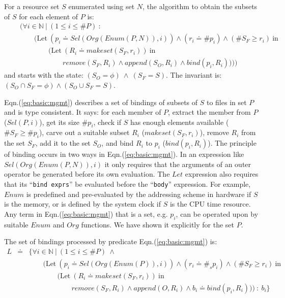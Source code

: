 \documentclass[draft]{article}
\def\names{\doteq}
\def\eqn#1{Eqn.(\ref{#1})}
\begin{document}
For  a resource set  $S$ enumerated  using set  $N$, the  algorithm to
obtain the subsets of $S$ for each element of $P$ is:
\begin{eqnarray}
  \label{eq:basic:mgmt}
  &~&
  \biggl(
  \forall i \in \mathbb{N}\ \vert\ (1 \le i \le \#P)\ :\ 
  \nonumber \\
  &~& \quad \quad 
  \bigl(\mathrm{Let}\ (p_i \names Sel(Org(Enum(P,N)), i)) \wedge (r_i
  \names \#p_i) \wedge (\#S_F \ge r_i)
  \ \mathrm{in} 
  \nonumber \\
  &~& \quad \quad \quad \quad (\mathrm{Let}\ (R_i \names makeset(S_F,
  r_i)) \ \mathrm{in} 
  \nonumber \\
  &~& \quad \quad \quad \quad \quad \quad remove (S_F, R_i) \wedge
  append(S_O, R_i)  \wedge bind (p_i, R_i) 
  )\bigr)\biggr)
\end{eqnarray}
and starts  with the state:  $(S_O = \phi)\  \wedge\ (S_F =  S)$.  The
invariant  is: $(S_O  \cap S_F  = \phi)  \wedge (S_O  \cup S_F  = S)$.

\eqn{eq:basic:mgmt} describes a  set of bindings of subsets  of $S$ to
files in set $P$ and is  type consistent.  It says: for each member of
$P$, extract the member from  $P$ ($Sel(P, i)$), get its size $\#p_i$,
check if $S$ has enough  elements available ($\#S_F \ge \#p_i$), carve
out a  suitable subset $R_i$ ($makeset(S_F, r_i)$),  remove $R_i$ from
the  set $S_F$,  add it  to the  set $S_O$,  and bind  $R_i$  to $p_i$
($bind(p_i, R_i)$).   The principle of  binding occurs in two  ways in
\eqn{eq:basic:mgmt}.  In  an expression like  $Sel(Org(Enum(P,N)), i)$
it only requires that the  arguments of an outer operator be generated
before its  own evaluation.  The  $Let$ expression also  requires that
its ``\texttt{bind exprs}''  be evaluated before the ``\texttt{body}''
expression.  For  example, $Enum$  is predefined and  pre-evaluated by
the addressing scheme in hardware if  $S$ is the memory, or is defined
by the  system clock  if $S$ is  the CPU  time resource.  Any  term in
\eqn{eq:basic:mgmt} that is  a set, e.g.  $p_i$, can  be operated upon
by suitable $Enum$  and $Org$ functions.  We have  shown it explicitly
for the set $P$.
 
The set of bindings processed by predicate \eqn{eq:basic:mgmt} is:
\begin{eqnarray}
  \label{eq:basic:mgmt:set}
  L &\names& \biggl\{
  \forall i \in \mathbb{N}\ \vert\ (1 \le i \le \#P)\ \wedge\  
  \nonumber \\
  &~& \quad \quad 
  \bigl(\mathrm{Let}\ (p_i \names Sel(Org(Enum(P)), i)) \wedge (r_i
  \names \#_sp_i) \wedge (\#S_F \ge r_i)
  \ \mathrm{in} 
  \nonumber \\
  &~& \quad \quad \quad \quad (\mathrm{Let}\ (R_i \names makeset(S_F,
  r_i)) \ \mathrm{in} 
  \nonumber \\
  &~& \quad \quad \quad \quad \quad \quad remove (S_F, R_i) \wedge
  append(O, R_i) \wedge b_i \names bind (p_i, R_i)
  )\bigr)\ :\ b_i\biggr\}
\end{eqnarray}
\end{document}
